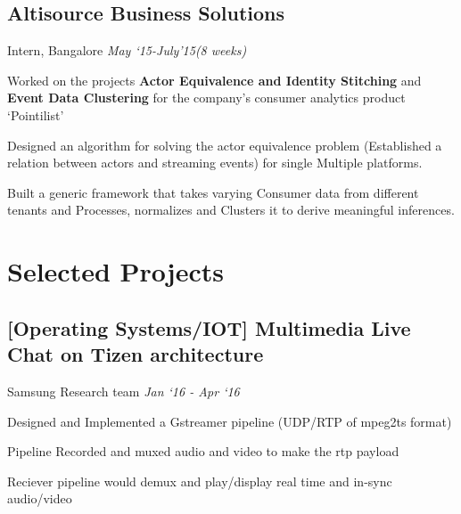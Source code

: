 \documentclass[letterpaper]{twentysecondcv} %
\begin{document}
\subsection{ \textbf{Altisource Business Solutions} }
\vspace{-2mm}
Intern, Bangalore \hfill \emph{May `15-July'15(8 weeks)}\\
\vspace{-3mm}
\begin{list3}
\item Worked on the projects \textbf{Actor Equivalence and Identity Stitching} and \textbf{Event Data Clustering} for the company's consumer analytics product `Pointilist'
\item Designed an algorithm for solving the actor equivalence problem (Established a relation between actors and streaming events) for single Multiple platforms.
\item Built a generic framework that takes varying Consumer data from different tenants and Processes, normalizes and Clusters it to derive meaningful inferences.
  \newline
  \newline
  \newline
\end{list3} 

\vspace{-2mm}
\section{Selected Projects}
\subsection{ \textbf{[Operating Systems/IOT] Multimedia Live Chat on Tizen architecture  }}
\vspace{-2mm}
Samsung Research team \hfill \emph{Jan `16 - Apr `16}
\begin{list3}
\item Designed and Implemented a Gstreamer pipeline
  (UDP/RTP of mpeg2ts format)
\item Pipeline Recorded and muxed audio and video to make the rtp payload
\item Reciever pipeline would demux and play/display real time and in-sync audio/video \\
  \newline
  \newline
\end{list3}
\vspace{-3mm}
\end{document}
